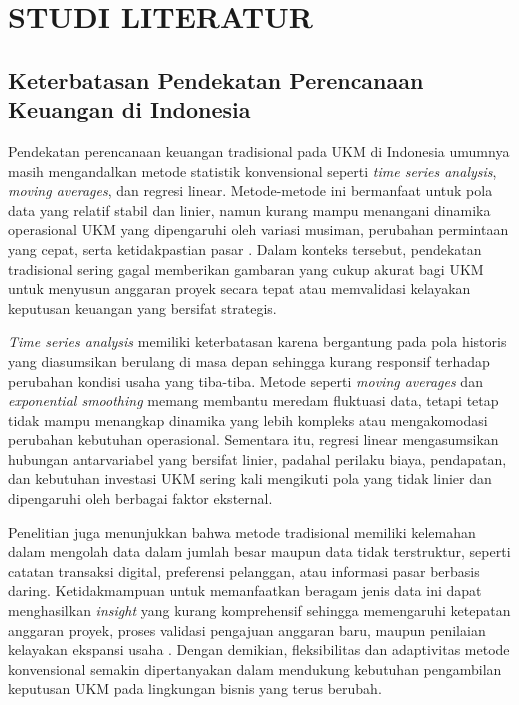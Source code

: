 \chapter{STUDI LITERATUR}
\label{chap:studi-literatur}
\section{Keterbatasan Pendekatan Perencanaan Keuangan di Indonesia}
Pendekatan perencanaan keuangan tradisional pada UKM di Indonesia umumnya masih mengandalkan metode statistik konvensional seperti \textit{time series analysis}, \textit{moving averages}, dan regresi linear. Metode-metode ini bermanfaat untuk pola data yang relatif stabil dan linier, namun kurang mampu menangani dinamika operasional UKM yang dipengaruhi oleh variasi musiman, perubahan permintaan yang cepat, serta ketidakpastian pasar \autocite{bahrammirzaee2010}. Dalam konteks tersebut, pendekatan tradisional sering gagal memberikan gambaran yang cukup akurat bagi UKM untuk menyusun anggaran proyek secara tepat atau memvalidasi kelayakan keputusan keuangan yang bersifat strategis.

\textit{Time series analysis} memiliki keterbatasan karena bergantung pada pola historis yang diasumsikan berulang di masa depan sehingga kurang responsif terhadap perubahan kondisi usaha yang tiba-tiba. Metode seperti \textit{moving averages} dan \textit{exponential smoothing} memang membantu meredam fluktuasi data, tetapi tetap tidak mampu menangkap dinamika yang lebih kompleks atau mengakomodasi perubahan kebutuhan operasional. Sementara itu, regresi linear mengasumsikan hubungan antarvariabel yang bersifat linier, padahal perilaku biaya, pendapatan, dan kebutuhan investasi UKM sering kali mengikuti pola yang tidak linier dan dipengaruhi oleh berbagai faktor eksternal.

Penelitian juga menunjukkan bahwa metode tradisional memiliki kelemahan dalam mengolah data dalam jumlah besar maupun data tidak terstruktur, seperti catatan transaksi digital, preferensi pelanggan, atau informasi pasar berbasis daring. Ketidakmampuan untuk memanfaatkan beragam jenis data ini dapat menghasilkan \textit{insight} yang kurang komprehensif sehingga memengaruhi ketepatan anggaran proyek, proses validasi pengajuan anggaran baru, maupun penilaian kelayakan ekspansi usaha \autocite{bahrammirzaee2010}. Dengan demikian, fleksibilitas dan adaptivitas metode konvensional semakin dipertanyakan dalam mendukung kebutuhan pengambilan keputusan UKM pada lingkungan bisnis yang terus berubah.


